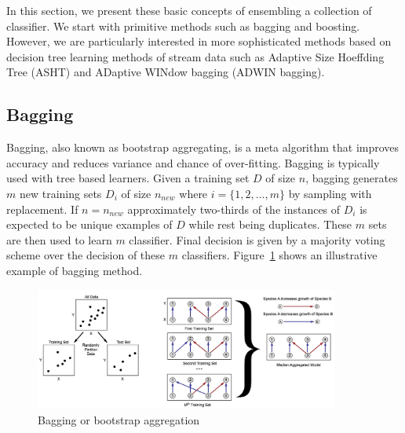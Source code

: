 \documentclass[a4paper, 11pt, oneside]{book}
\begin{document}
In this section, we present these basic concepts of ensembling a collection of classifier. We start with primitive methods such as bagging and boosting. However, we are particularly interested in more sophisticated methods based on decision tree learning methods of stream data such as Adaptive Size Hoeffding Tree (ASHT) and ADaptive WINdow bagging (ADWIN bagging).

\subsection{Bagging}
\label{sec:bg:bagging}
Bagging, also known as bootstrap aggregating, is a meta algorithm that improves accuracy and reduces variance and chance of over-fitting. Bagging is typically used with tree based learners. Given a training set $D$ of size $n$, bagging generates $m$ new training sets $D_i$ of size $n_{new}$ where $i = \{1, 2, \dots, m\}$ by sampling with replacement. If $n = n_{new}$ approximately two-thirds of the instances of $D_i$ is expected to be unique examples of $D$ while rest being duplicates. These $m$ sets are then used to learn $m$ classifier. Final decision is given by a majority voting scheme over the decision of these $m$ classifiers. Figure~\ref{fig:bg:bagging} shows an illustrative example of bagging method.
\begin{figure}[htbp]
    \begin{center}
        \includegraphics[width=10.0cm]{figs/bagging.jpg}
        \caption{Bagging or bootstrap aggregation}
        \label{fig:bg:bagging}
    \end{center}
\end{figure}

\end{document}
